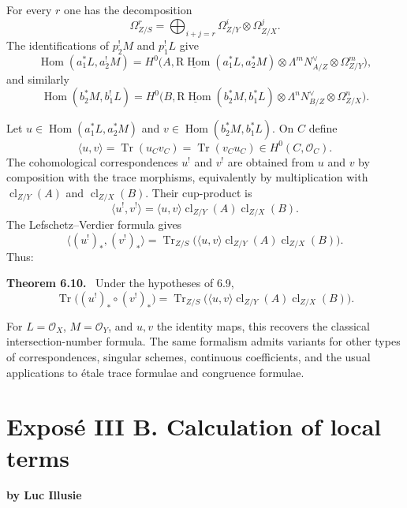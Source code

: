 \documentclass[12pt]{article}
\newcommand{\Hom}{\operatorname{Hom}}
\newcommand{\Tr}{\operatorname{Tr}}
\newcommand{\cl}{\operatorname{cl}}
\newcommand{\R}{\mathrm R}
\newcommand{\cO}{\mathcal O}
\newenvironment{statement}[1]{\par\medskip\noindent\textbf{#1.}\ }{\par\medskip}
\begin{document}
For every $r$ one has the decomposition
\begin{equation}
   \Omega^r_{Z/S}=\bigoplus_{i+j=r}\Omega^i_{Z/Y}\otimes\Omega^j_{Z/X}.
   \tag{6.9.0}
\end{equation}
The identifications of $p_2^!M$ and $p_1^!L$ give
\begin{equation}
\Hom(a_1^*L,a_2^!M)=
H^0\bigl(A,\underline{\R\Hom}(a_1^*L,a_2^*M)\otimes
\Lambda^mN_{A/Z}^{\vee}\otimes\Omega^m_{Z/Y}\bigr),
\tag{6.9.1}
\end{equation}
and similarly
\begin{equation}
\Hom(b_2^*M,b_1^!L)=
H^0\bigl(B,\underline{\R\Hom}(b_2^*M,b_1^*L)\otimes
\Lambda^nN_{B/Z}^{\vee}\otimes\Omega^n_{Z/X}\bigr).
\tag{6.9.2}
\end{equation}

Let $u\in\Hom(a_1^*L,a_2^*M)$ and $v\in\Hom(b_2^*M,b_1^*L)$. On $C$ define
\begin{equation}
   \langle u,v\rangle=\Tr(u_Cv_C)=\Tr(v_Cu_C)\in H^0(C,\cO_C).
   \tag{6.9.3}
\end{equation}
The cohomological correspondences $u^!$ and $v^!$ are obtained from $u$ and $v$ by composition with the trace morphisms, equivalently by multiplication with $\cl_{Z/Y}(A)$ and $\cl_{Z/X}(B)$. Their cup-product is
\begin{equation}
   \langle u^!,v^!\rangle=
   \langle u,v\rangle\cl_{Z/Y}(A)\cl_{Z/X}(B).
   \tag{6.9.4}
\end{equation}
The Lefschetz--Verdier formula gives
\begin{equation}
   \langle (u^!)_*,(v^!)_*\rangle=
   \Tr_{Z/S}\bigl(\langle u,v\rangle\cl_{Z/Y}(A)\cl_{Z/X}(B)\bigr).
   \tag{6.9.5}
\end{equation}
Thus:

\begin{statement}{Theorem 6.10}
Under the hypotheses of 6.9,
\[
   \Tr\bigl((u^!)_*\circ (v^!)_*\bigr)=
   \Tr_{Z/S}\bigl(\langle u,v\rangle\cl_{Z/Y}(A)\cl_{Z/X}(B)\bigr).
\]
\end{statement}

For $L=\cO_X$, $M=\cO_Y$, and $u,v$ the identity maps, this recovers the classical intersection-number formula. The same formalism admits variants for other types of correspondences, singular schemes, continuous coefficients, and the usual applications to étale trace formulae and congruence formulae.

\section*{Exposé III B. Calculation of local terms}
\begin{center}
{\large\bfseries by Luc Illusie}
\end{center}
\end{document}
